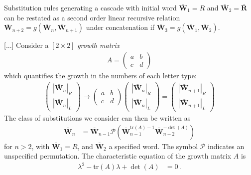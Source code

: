 \begin{theorem}\label{secorder} %
Substitution rules generating a cascade
with initial word $\bar{\mathbf{W}}_{1}=R$ and
$\bar{\mathbf{W}}_{2}=\bar{\mathbf{R}}$ can be restated as a second order
linear recursive relation
$\bar{\mathbf{W}}_{n+2}=g(\bar{\mathbf{W}}_{n},\bar{\mathbf{W}}_{n+1})$
under concatenation if
$\bar{\mathbf{W}}_{3}=g(\bar{\mathbf{W}}_{1},\bar{\mathbf{W}}_{2})$. %
\end{theorem}
[...]
Consider a $[2\times2]$ \emph{growth matrix}
\begin{align}
A=\left(\begin{array}{cc}
a & b\\
c & d
\end{array}\right)
\end{align}
which quantifies the growth in the numbers of each letter type:
\begin{align}
\left(\begin{array}{c}
\left|\bar{\mathbf{W}}_{n}\right|_R\\
\left|\bar{\mathbf{W}}_{n}\right|_L
\end{array}\right)\rightarrow\left(\begin{array}{cc}
a & b\\
c & d
\end{array}\right)\left(\begin{array}{c}
\left|\bar{\mathbf{W}}_n\right|_R\\
\left|\bar{\mathbf{W}}_n\right|_L
\end{array}\right)=\left(\begin{array}{c}
\left|\bar{\mathbf{W}}_{n+1}\right|_R\\
\left|\bar{\mathbf{W}}_{n+1}\right|_L
\end{array}\right)
\end{align}
The class of substitutions we consider
can then be written as
%
\begin{align}
\bar{\mathbf{W}}_{n}&=\bar{\mathbf{W}}_{n-1}\mathcal{P}\left(\bar{\mathbf{W}}_{n-1}^{\text{tr}\left(A\right)-1}\bar{\mathbf{W}}_{n-2}^{-\det\left(A\right)}\right)
\end{align}
%
for $n>2$, with $\bar{\mathbf{W}}_{1}=R$, and $\bar{\mathbf{W}}_{2}$
a specified word. The symbol $\mathcal{P}$ indicates an unspecified
permutation. The characteristic equation of the growth matrix $A$ is
%
\begin{align}
\lambda^{2}-\text{tr}\left(A\right)\lambda+\det\left(A\right)&=0
\,.
\label{eq:W_characteristic}
\end{align}

